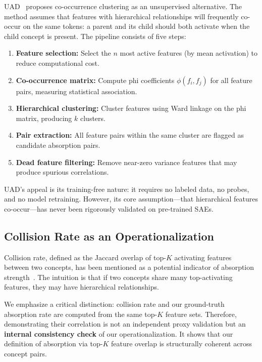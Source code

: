 \documentclass{article}
\begin{document}
UAD~\citep{chanin2024absorption} proposes co-occurrence clustering as an unsupervised alternative. The method assumes that features with hierarchical relationships will frequently co-occur on the same tokens: a parent and its child should both activate when the child concept is present. The pipeline consists of five steps:
\begin{enumerate}
\item \textbf{Feature selection:} Select the $n$ most active features (by mean activation) to reduce computational cost.
\item \textbf{Co-occurrence matrix:} Compute phi coefficients $\phi(f_i, f_j)$ for all feature pairs, measuring statistical association.
\item \textbf{Hierarchical clustering:} Cluster features using Ward linkage on the phi matrix, producing $k$ clusters.
\item \textbf{Pair extraction:} All feature pairs within the same cluster are flagged as candidate absorption pairs.
\item \textbf{Dead feature filtering:} Remove near-zero variance features that may produce spurious correlations.
\end{enumerate}

UAD's appeal is its training-free nature: it requires no labeled data, no probes, and no model retraining. However, its core assumption---that hierarchical features co-occur---has never been rigorously validated on pre-trained SAEs.

\subsection{Collision Rate as an Operationalization}

Collision rate, defined as the Jaccard overlap of top-$K$ activating features between two concepts, has been mentioned as a potential indicator of absorption strength~\citep{chanin2024absorption}. The intuition is that if two concepts share many top-activating features, they may have hierarchical relationships.

We emphasize a critical distinction: collision rate and our ground-truth absorption rate are computed from the same top-$K$ feature sets. Therefore, demonstrating their correlation is not an independent proxy validation but an \textbf{internal consistency check} of our operationalization. It shows that our definition of absorption via top-$K$ feature overlap is structurally coherent across concept pairs.
\end{document}

